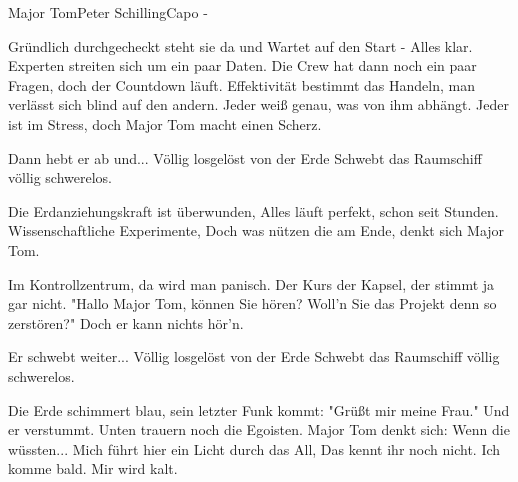 \begin{song}{Major Tom}{Peter Schilling}{Capo -}

Gründlich durchgecheckt steht sie da und
Wartet auf den Start - Alles klar.
Experten streiten sich um ein paar Daten.
Die Crew hat dann noch ein paar Fragen, doch der Countdown läuft.
Effektivität bestimmt das Handeln, man verlässt sich blind auf den andern.
Jeder weiß genau, was von ihm abhängt.
Jeder ist im Stress, doch Major Tom macht einen Scherz.

Dann hebt er ab und...
Völlig losgelöst von der Erde
Schwebt das Raumschiff völlig schwerelos.

Die Erdanziehungskraft ist überwunden,
Alles läuft perfekt, schon seit Stunden.
Wissenschaftliche Experimente,
Doch was nützen die am Ende, denkt sich Major Tom.

Im Kontrollzentrum, da wird man panisch.
Der Kurs der Kapsel, der stimmt ja gar nicht.
"Hallo Major Tom, können Sie hören?
Woll'n Sie das Projekt denn so zerstören?" Doch er kann nichts hör'n.

\newpage
{}
Er schwebt weiter...
Völlig losgelöst von der Erde
Schwebt das Raumschiff völlig schwerelos.

Die Erde schimmert blau, sein letzter Funk kommt: "Grüßt mir meine Frau."
Und er verstummt.
Unten trauern noch die Egoisten. Major Tom denkt sich: Wenn die wüssten...
Mich führt hier ein Licht durch das All,
Das kennt ihr noch nicht. Ich komme bald. Mir wird kalt.



\end{song}
